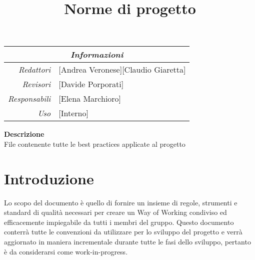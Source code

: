 \documentclass[12pt]{article}
\begin{document}
\graphicspath{ {../templates/img/} }
\setcounter{tocdepth}{4}
\setcounter{secnumdepth}{4}
\title{Norme di progetto}

\firstPage

\maketitle

\begin{center}
    \begin{tabular}{r | l}
        \multicolumn{2}{c}{\textit{Informazioni}}      \\
        \hline

        \textit{Redattori}    &
        [Andrea Veronese][Claudio Giaretta]\makecell{} \\

        \textit{Revisori}     &
        [Davide Porporati]\makecell{}                  \\
        \textit{Responsabili} &
        [Elena Marchioro]\makecell{}                   \\
        \textit{Uso}          &
        [Interno]\makecell{}                           \\
    \end{tabular}
\end{center}

\begin{center}
    \textbf{Descrizione}\\
    File contenente tutte le best practices applicate al progetto
\end{center}

\pagebreak

\tableofcontents

\pagebreak

\printindex

\makeversioni
\section{Introduzione}
Lo scopo del documento è quello di fornire un insieme di regole, strumenti e standard di qualità necessari per creare un Way of Working condiviso ed efficacemente impiegabile da tutti i membri del gruppo.
Questo documento conterrà tutte le convenzioni da utilizzare per lo sviluppo del progetto e verrà aggiornato in maniera incrementale durante tutte le fasi dello sviluppo, pertanto è da considerarsi come work-in-progress.
\end{document}
